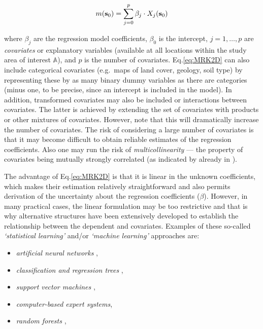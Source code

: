 \documentclass[11pt]{krantz}
\theoremstyle{definition}
\theoremstyle{definition}
\theoremstyle{definition}
\theoremstyle{remark}
\begin{document}
\begin{equation}
m({\bf{s}}_0 ) = \sum\limits_{j = 0}^p { \beta _j \cdot X_j ({\bf{s}}_0 )}
\label{eq:MRK2D}
\end{equation}

where \(\beta _j\) are the regression model coefficients, \(\beta _0\)
is the intercept, \(j=1,\ldots,p\) are \emph{covariates} or explanatory
variables (available at all locations within the study area of interest
\(\mathbb{A}\)), and \(p\) is the number of covariates.
Eq.\eqref{eq:MRK2D} can also include categorical covariates (e.g.~maps of
land cover, geology, soil type) by representing these by as many binary
dummy variables as there are categories (minus one, to be precise, since
an intercept is included in the model). In addition, transformed
covariates may also be included or interactions between covariates. The
latter is achieved by extending the set of covariates with products or
other mixtures of covariates. However, note that this will dramatically
increase the number of covariates. The risk of considering a large
number of covariates is that it may become difficult to obtain reliable
estimates of the regression coefficients. Also one may run the risk of
\emph{multicollinearity} --- the property of covariates being mutually
strongly correlated (as indicated by \citet{Jenny1968} already in
\citeyearpar{Jenny1968}).

The advantage of Eq.\eqref{eq:MRK2D} is that it is linear in the unknown
coefficients, which makes their estimation relatively straightforward
and also permits derivation of the uncertainty about the regression
coefficients (\(\beta\)). However, in many practical cases, the linear
formulation may be too restrictive and that is why alternative
structures have been extensively developed to establish the relationship
between the dependent and covariates. Examples of these so-called
\emph{`statistical learning'} and/or \emph{`machine learning'}
approaches are:

\begin{itemize}
\item
  \emph{artificial neural networks} \citep{yegnanarayana2004artificial},
\item
  \emph{classification and regression trees}
  \citep{breiman1993classification},
\item
  \emph{support vector machines} \citep{hearst1998support},
\item
  \emph{computer-based expert systems},
\item
  \emph{random forests}
  \citep{breiman2001random, meinshausen2006quantile},
\end{itemize}
\end{document}
